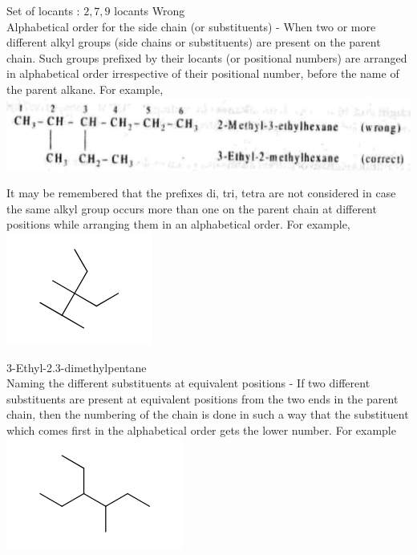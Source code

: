 \documentclass[10pt]{article}
\begin{document}
Set of locants : $2,7,9$ locants Wrong\\
Alphabetical order for the side chain (or substituents) - When two or more different alkyl groups (side chains or substituents) are present on the parent chain. Such groups prefixed by their locants (or positional numbers) are arranged in alphabetical order irrespective of their positional number, before the name of the parent alkane. For example,\\
\includegraphics[max width=\textwidth, center]{2025_01_28_8470952b98110cec3aabg-020}

It may be remembered that the prefixes di, tri, tetra are not considered in case the same alkyl group occurs more than one on the parent chain at different positions while arranging them in an alphabetical order. For example,\\
\includegraphics{smile-95312794c16f67a554f0bd87e70d94ddeb4d7c02}

3-Ethyl-2.3-dimethylpentane\\
Naming the different substituents at equivalent positions - If two different substituents are present at equivalent positions from the two ends in the parent chain, then the numbering of the chain is done in such a way that the substituent which comes first in the alphabetical order gets the lower number. For example\\
\includegraphics{smile-9afdbe6eeebc88ad856010be37f98bf62bdfe04c}
\end{document}
